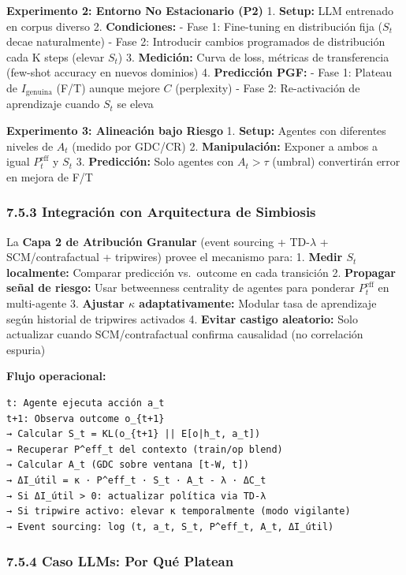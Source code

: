 \textbf{Experimento 2: Entorno No Estacionario (P2)} 1. \textbf{Setup:}
LLM entrenado en corpus diverso 2. \textbf{Condiciones:} - Fase 1:
Fine-tuning en distribución fija (\(S_t\) decae naturalmente) - Fase 2:
Introducir cambios programados de distribución cada K steps (elevar
\(S_t\)) 3. \textbf{Medición:} Curva de loss, métricas de transferencia
(few-shot accuracy en nuevos dominios) 4. \textbf{Predicción PGF:} -
Fase 1: Plateau de \(I_{\text{genuina}}\) (F/T) aunque mejore \(C\)
(perplexity) - Fase 2: Re-activación de aprendizaje cuando \(S_t\) se
eleva

\textbf{Experimento 3: Alineación bajo Riesgo} 1. \textbf{Setup:}
Agentes con diferentes niveles de \(A_t\) (medido por GDC/CR) 2.
\textbf{Manipulación:} Exponer a ambos a igual \(P^{\text{eff}}_t\) y
\(S_t\) 3. \textbf{Predicción:} Solo agentes con \(A_t > \tau\) (umbral)
convertirán error en mejora de F/T

\subsubsection{7.5.3 Integración con Arquitectura de
Simbiosis}\label{integraciuxf3n-con-arquitectura-de-simbiosis}

La \textbf{Capa 2 de Atribución Granular} (event sourcing +
TD-\(\lambda\) + SCM/contrafactual + tripwires) provee el mecanismo
para: 1. \textbf{Medir \(S_t\) localmente:} Comparar predicción
vs.~outcome en cada transición 2. \textbf{Propagar señal de riesgo:}
Usar betweenness centrality de agentes para ponderar
\(P^{\text{eff}}_t\) en multi-agente 3. \textbf{Ajustar \(\kappa\)
adaptativamente:} Modular tasa de aprendizaje según historial de
tripwires activados 4. \textbf{Evitar castigo aleatorio:} Solo
actualizar cuando SCM/contrafactual confirma causalidad (no correlación
espuria)

\textbf{Flujo operacional:}

\begin{verbatim}
t: Agente ejecuta acción a_t
t+1: Observa outcome o_{t+1}
→ Calcular S_t = KL(o_{t+1} || E[o|h_t, a_t])
→ Recuperar P^eff_t del contexto (train/op blend)
→ Calcular A_t (GDC sobre ventana [t-W, t])
→ ΔI_útil = κ · P^eff_t · S_t · A_t - λ · ΔC_t
→ Si ΔI_útil > 0: actualizar política via TD-λ
→ Si tripwire activo: elevar κ temporalmente (modo vigilante)
→ Event sourcing: log (t, a_t, S_t, P^eff_t, A_t, ΔI_útil)
\end{verbatim}

\subsubsection{7.5.4 Caso LLMs: Por Qué
Platean}\label{caso-llms-por-quuxe9-platean}

